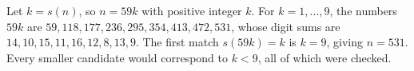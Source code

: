 Let $k=s(n)$, so $n=59k$ with positive integer $k$. For $k=1,\ldots,9$, the numbers $59k$ are $59,118,177,236,295,354,413,472,531$, whose digit sums are $14,10,15,11,16,12,8,13,9$. The first match $s(59k)=k$ is $k=9$, giving $\boxed{n=531}$. Every smaller candidate would correspond to $k<9$, all of which were checked.
